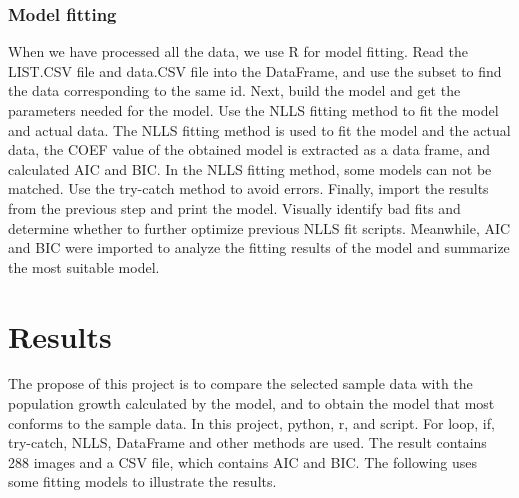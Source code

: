 \documentclass[11pt,a4 paper,title page]{article}
\begin{document}
    \subsubsection{Model fitting}
    When we have processed all the data, we use R for model fitting. Read the LIST.CSV file and data.CSV file into the DataFrame, and use the subset to find the data corresponding to the same id. Next, build the model and get the parameters needed for the model. Use the NLLS fitting method to fit the model and actual data. The NLLS fitting method is used to fit the model and the actual data, the COEF value of the obtained model is extracted as a data frame, and calculated AIC and BIC. In the NLLS fitting method, some models can not be matched. Use the try-catch method to avoid errors. Finally, import the results from the previous step and print the model. Visually identify bad fits and determine whether to further optimize previous NLLS fit scripts. Meanwhile, AIC and BIC were imported to analyze the fitting results of the model and summarize the most suitable model.

    
    
  \section{Results}
  The propose of this project is to compare the selected sample data with the population growth calculated by the model, and to obtain the model that most conforms to the sample data. In this project, python, r, and script. For loop, if, try-catch, NLLS, DataFrame and other methods are used. The result contains 288 images and a CSV file, which contains AIC and BIC. The following uses some fitting models to illustrate the results.
  \hfill\break
\end{document}

